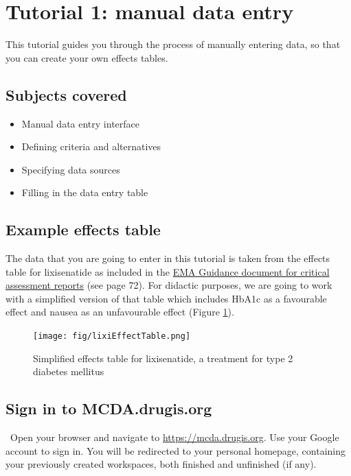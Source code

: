 \documentclass[00_mcda_tutorial.tex]{subfiles}
\begin{document}
\section*{Tutorial 1: manual data entry}
\addtocounter{section}{1}

This tutorial guides you through the process of manually entering data, so that you can create your own effects tables.

\subsection*{Subjects covered}
\begin{itemize}
    \item Manual data entry interface
    \item Defining criteria and alternatives
    \item Specifying data sources
    \item Filling in the data entry table
\end{itemize}

\subsection*{Example effects table}
The data that you are going to enter in this tutorial is taken from the effects table for lixisenatide as included in the \href{https://www.ema.europa.eu/documents/template-form/day-80-assessment-report-overview-d120-loq-template-guidance-rev-0718_en.doc}{EMA Guidance document for critical assessment reports} (see page 72).  For didactic purposes, we are going to work with a simplified version of that table which includes HbA1c as a favourable effect and nausea as an unfavourable effect (Figure \ref{fig:lixisenatide_effect_table}).

\begin{figure}[!h]
    \centering
    \texttt{[image: fig/lixiEffectTable.png]}
    \caption{Simplified effects table for lixisenatide, a treatment for type 2 diabetes mellitus}
    \label{fig:lixisenatide_effect_table}
\end{figure}

\subsection*{Sign in to MCDA.drugis.org}
\leftpointright \, Open your browser and navigate to \href{https://mcda.drugis.org}{https://mcda.drugis.org}. Use your Google account to sign in. You will be redirected to your personal homepage, containing your previously created workspaces, both finished and unfinished (if any).
\end{document}
